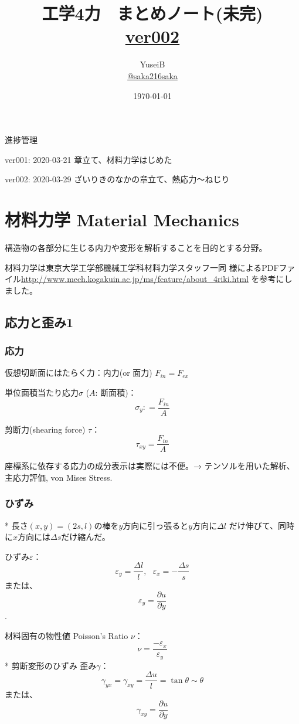 \documentclass[a4j,10pt,oneside,openany]{jsbook}
\title{工学4力　まとめノート(未完) \\ \small{\url{ver002}}}
\author{YuseiB  \\ \url{@saka216saka}}
\date{\today}
\newcommand{\partialder}[2]{\frac{\partial #1}{\partial #2}}
\newcommand{\coloneqq}{\mathrel{\mathop:}=}
\begin{document}
\maketitle
\frontmatter
\tableofcontents
\mainmatter

進捗管理

ver001: 2020-03-21 章立て、材料力学はじめた

ver002: 2020-03-29 ざいりきのなかの章立て、熱応力～ねじり

\chapter{材料力学 Material Mechanics}

構造物の各部分に生じる内力や変形を解析することを目的とする分野。

材料力学は東京大学工学部機械工学科材料力学スタッフ一同 様によるPDFファイル\url{http://www.mech.kogakuin.ac.jp/ms/feature/about_4riki.html} を参考にしました。

\section{応力と歪み1}
\subsection{応力}
仮想切断面にはたらく力：内力(or 面力) $F_{in} = F_{ex}$

単位面積当たり応力$\sigma$  ($A$: 断面積)：
\[\sigma_y \coloneqq \frac{F_{in}}{A}\]

剪断力(shearing force) $\tau$：
\[\tau_{xy} = \frac{F_{in}}{A}\]

座標系に依存する応力の成分表示は実際には不便。→ テンソルを用いた解析、主応力評価, von Mises Stress.

\subsection{ひずみ}
* 長さ$(x,y) = (2s, l)$の棒を$y$方向に引っ張ると$y$方向に$\Delta l$ だけ伸びて、同時に$x$方向には$\Delta s$だけ縮んだ。

ひずみ$\varepsilon$：
\[ \varepsilon_y = \frac{\Delta l}{l},\ \ \ \varepsilon_x = -\frac{\Delta s}{s}\]
または、
\[\varepsilon_y = \partialder{u}{y}\].

材料固有の物性値 Poisson's Ratio $\nu$：
\[\nu = \frac{-\varepsilon_x}{\varepsilon_y}\]
\newline
* 剪断変形のひずみ
歪み$\gamma$：
\[ \gamma_{yx} = \gamma_{xy} = \frac{\Delta u}{l} = \tan \theta \sim \theta \]
または、
\[\gamma_{xy} = \partialder{u}{y}\]
\end{document}
